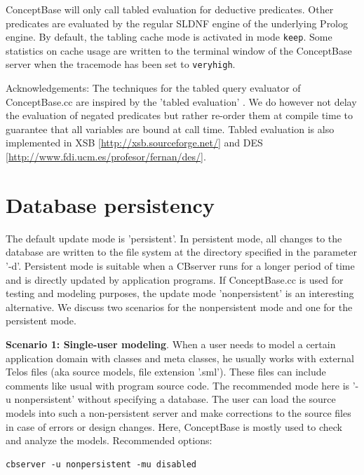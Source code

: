 ConceptBase will only call tabled evaluation for deductive predicates.
Other predicates are evaluated by the regular SLDNF engine of the
underlying Prolog engine.
By default, the tabling cache mode is activated in mode {\tt keep}.
Some statistics on cache usage are written to the terminal window of
the ConceptBase server when the tracemode has been set to {\tt veryhigh}. 

Acknowledgements: The techniques for the
tabled query evaluator of ConceptBase.cc are inspired by the 'tabled evaluation' \cite{ssw94,chenwarren96}.
We do however not delay the evaluation of negated predicates but rather re-order
them at compile time to guarantee that all variables are bound at call time.
Tabled evaluation is also implemented in XSB [\url{http://xsb.sourceforge.net/}]
and DES [\url{http://www.fdi.ucm.es/profesor/fernan/des/}].


\section{Database persistency}
\label{sec:persistency}

The default update mode is 'persistent'. In persistent mode, all changes
to the database are written to the file system at the directory specified in
the parameter '-d'. Persistent mode is suitable when a CBserver
runs for a longer period of time and is directly updated by
application programs. 
If ConceptBase.cc is used for testing and modeling
purposes, the update mode 'nonpersistent' is an interesting alternative.
We discuss two scenarios for the nonpersistent mode and one for the
persistent mode.
\newline

{\bf Scenario 1: Single-user modeling}. When a user needs to model a certain
application domain with classes and meta classes, he usually works
with external Telos files (aka source models, file extension '.sml').
These files can include comments like usual with program source code.
The recommended mode here is '-u nonpersistent' without specifying a
database. The user can load the source models
into such a non-persistent server and make corrections to the source
files in case of errors or design changes. Here, ConceptBase is
mostly used to check and analyze the models.
Recommended options:
\begin{verbatim}
cbserver -u nonpersistent -mu disabled
\end{verbatim}

